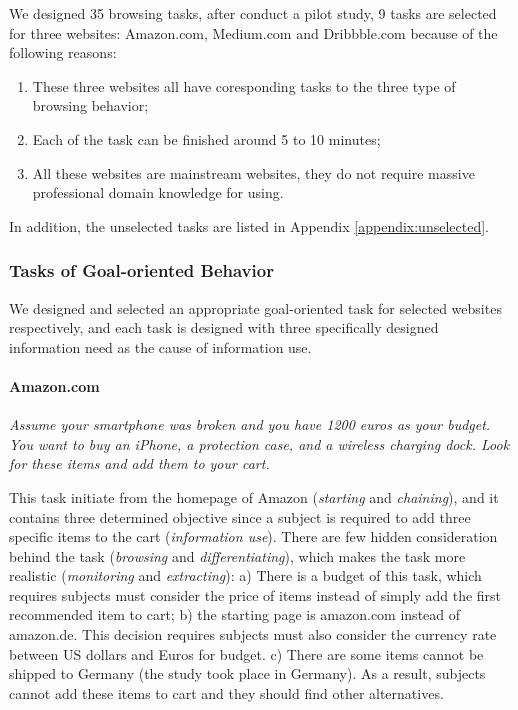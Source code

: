 We designed 35 browsing tasks, after conduct a pilot study, 
9 tasks are selected for three websites: Amazon.com, Medium.com and Dribbble.com 
because of the following reasons:

\begin{enumerate}
    \item These three websites all have coresponding tasks to the three type of browsing behavior;
    \item Each of the task can be finished around 5 to 10 minutes;
    \item All these websites are mainstream websites, they do not require 
        massive professional domain knowledge for using.
\end{enumerate}

In addition, the unselected tasks are listed in Appendix \ref{appendix:unselected}.

\subsubsection{Tasks of Goal-oriented Behavior}

We designed and selected an appropriate goal-oriented task for selected websites respectively,
and each task is designed with three specifically designed information need as
the cause of information use.

\paragraph{Amazon.com} \emph{Assume your smartphone was broken and you have 1200 euros 
    as your budget. You want to buy an iPhone, a protection case, and a wireless 
    charging dock. Look for these items and add them to your cart.}

This task initiate from the homepage of Amazon (\emph{starting} and \emph{chaining}), 
and it contains three determined objective since 
a subject is required to add three specific items to the cart (\emph{information use}). 
There are few hidden consideration behind the task (\emph{browsing} and \emph{differentiating}),
which makes the task more realistic (\emph{monitoring} and \emph{extracting}): 
a) There is a budget of this task, which requires subjects must consider the
price of items instead of simply add the first recommended item to cart; 
b) the starting page is amazon.com instead of amazon.de. This decision requires
subjects must also consider the currency rate between US dollars and Euros for budget.
c) There are some items cannot be shipped to Germany (the study took place in Germany).
As a result, subjects cannot add these items to cart and they should find other alternatives.

